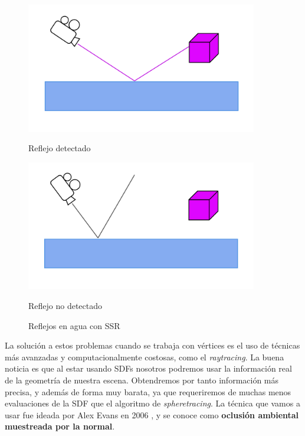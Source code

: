 \begin{figure}[!h]
     \begin{minipage}[c]{0.49\linewidth}
        \centering
        \includegraphics[width=0.9\textwidth]{Plantilla-TFG-master/img/ssr2.png}
        \caption{Reflejo detectado}
     \end{minipage}
     \begin{minipage}[c]{0.49\linewidth}
        \centering
        \includegraphics[width=0.9\textwidth]{Plantilla-TFG-master/img/ssr3.png}
        \caption{Reflejo no detectado}
     \end{minipage}
     \caption{Reflejos en agua con SSR}
     \label{fig:ssrEsquema}
\end{figure}

La solución a estos problemas cuando se trabaja con vértices es el uso de técnicas más avanzadas y computacionalmente costosas, como el \textit{raytracing}. La buena noticia es que al estar usando SDFs nosotros podremos usar la información real de la geometría de nuestra escena. Obtendremos por tanto información más precisa, y además de forma muy barata, ya que requeriremos de muchas menos evaluaciones de la SDF que el algoritmo de \textit{spheretracing}. La técnica que vamos a usar fue ideada por Alex Evans en 2006 \cite{ao}, y se conoce como \textbf{oclusión ambiental muestreada por la normal}.\newline

